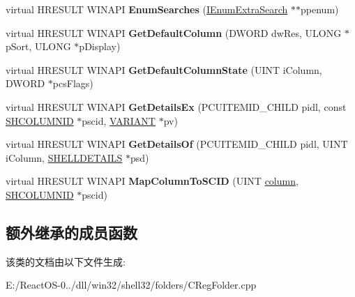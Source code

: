 \begin{DoxyCompactItemize}
\item 
\mbox{\label{class_c_reg_folder_a0330798ec2c980d9c5265de49e19a344}} 
virtual H\+R\+E\+S\+U\+LT W\+I\+N\+A\+PI {\bfseries Enum\+Searches} (\hyperlink{interface_i_enum_extra_search}{I\+Enum\+Extra\+Search} $\ast$$\ast$ppenum)
\item 
\mbox{\label{class_c_reg_folder_af15875989d9a39be85115ebdc719150a}} 
virtual H\+R\+E\+S\+U\+LT W\+I\+N\+A\+PI {\bfseries Get\+Default\+Column} (D\+W\+O\+RD dw\+Res, U\+L\+O\+NG $\ast$p\+Sort, U\+L\+O\+NG $\ast$p\+Display)
\item 
\mbox{\label{class_c_reg_folder_a74b2bcaa8529ab9d8878304887677b10}} 
virtual H\+R\+E\+S\+U\+LT W\+I\+N\+A\+PI {\bfseries Get\+Default\+Column\+State} (U\+I\+NT i\+Column, D\+W\+O\+RD $\ast$pcs\+Flags)
\item 
\mbox{\label{class_c_reg_folder_a1d66aa1766972f6a78415fb93f1e37cf}} 
virtual H\+R\+E\+S\+U\+LT W\+I\+N\+A\+PI {\bfseries Get\+Details\+Ex} (P\+C\+U\+I\+T\+E\+M\+I\+D\+\_\+\+C\+H\+I\+LD pidl, const \hyperlink{struct_i_shell_folder2_1_1_s_h_c_o_l_u_m_n_i_d}{S\+H\+C\+O\+L\+U\+M\+N\+ID} $\ast$pscid, \hyperlink{structtag_v_a_r_i_a_n_t}{V\+A\+R\+I\+A\+NT} $\ast$pv)
\item 
\mbox{\label{class_c_reg_folder_aea4e534db2e787691a6fa34cad63f328}} 
virtual H\+R\+E\+S\+U\+LT W\+I\+N\+A\+PI {\bfseries Get\+Details\+Of} (P\+C\+U\+I\+T\+E\+M\+I\+D\+\_\+\+C\+H\+I\+LD pidl, U\+I\+NT i\+Column, \hyperlink{struct_s_h_e_l_l_d_e_t_a_i_l_s}{S\+H\+E\+L\+L\+D\+E\+T\+A\+I\+LS} $\ast$psd)
\item 
\mbox{\label{class_c_reg_folder_a014bae4e7a6324e76780a0a6af5e701c}} 
virtual H\+R\+E\+S\+U\+LT W\+I\+N\+A\+PI {\bfseries Map\+Column\+To\+S\+C\+ID} (U\+I\+NT \hyperlink{structcolumn}{column}, \hyperlink{struct_i_shell_folder2_1_1_s_h_c_o_l_u_m_n_i_d}{S\+H\+C\+O\+L\+U\+M\+N\+ID} $\ast$pscid)
\end{DoxyCompactItemize}
\subsection*{额外继承的成员函数}


该类的文档由以下文件生成\+:\begin{DoxyCompactItemize}
\item 
E\+:/\+React\+O\+S-\/0../dll/win32/shell32/folders/C\+Reg\+Folder.\+cpp\end{DoxyCompactItemize}
